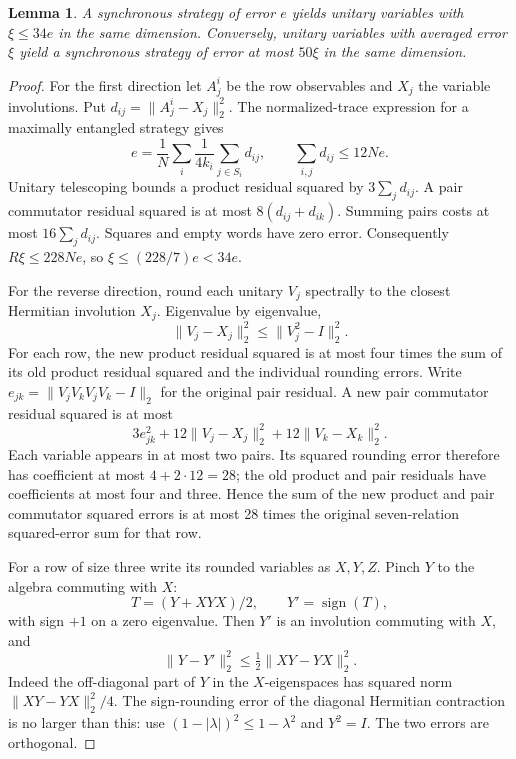 \documentclass[11pt,a4paper]{article}
\newtheorem{lemma}[theorem]{Lemma}
\newcommand{\norm}[1]{\lVert#1\rVert}
\begin{document}
\begin{lemma}\label{lem:gamewords}
A synchronous strategy of error $e$ yields unitary variables with $\xi\le34e$ in the same dimension. Conversely, unitary variables with averaged error $\xi$ yield a synchronous strategy of error at most $50\xi$ in the same dimension.
\end{lemma}
\begin{proof}
For the first direction let $A^i_j$ be the row observables and $X_j$ the variable involutions. Put $d_{ij}=\norm{A^i_j-X_j}_2^2$. The normalized-trace expression for a maximally entangled strategy gives
\[
 e=\frac1N\sum_i\frac1{4k_i}\sum_{j\in S_i}d_{ij},
 \qquad \sum_{i,j}d_{ij}\le12Ne.
\]
Unitary telescoping bounds a product residual squared by $3\sum_jd_{ij}$. A pair commutator residual squared is at most $8(d_{ij}+d_{ik})$. Summing pairs costs at most $16\sum_jd_{ij}$. Squares and empty words have zero error. Consequently $R\xi\le228Ne$, so $\xi\le(228/7)e<34e$.

For the reverse direction, round each unitary $V_j$ spectrally to the closest Hermitian involution $X_j$. Eigenvalue by eigenvalue,
\[
 \norm{V_j-X_j}_2^2\le\norm{V_j^2-I}_2^2.
\]
For each row, the new product residual squared is at most four times the sum of its old product residual squared and the individual rounding errors. Write $e_{jk}=\norm{V_jV_kV_jV_k-I}_2$ for the original pair residual. A new pair commutator residual squared is at most
\[
 3e_{jk}^2+12\norm{V_j-X_j}_2^2+12\norm{V_k-X_k}_2^2.
\]
Each variable appears in at most two pairs. Its squared rounding error therefore has coefficient at most $4+2\cdot12=28$; the old product and pair residuals have coefficients at most four and three. Hence the sum of the new product and pair commutator squared errors is at most 28 times the original seven-relation squared-error sum for that row.

For a row of size three write its rounded variables as $X,Y,Z$. Pinch $Y$ to the algebra commuting with $X$:
\[
 T=(Y+XYX)/2,\qquad Y'=\operatorname{sign}(T),
\]
with sign $+1$ on a zero eigenvalue. Then $Y'$ is an involution commuting with $X$, and
\begin{equation}
 \norm{Y-Y'}_2^2\le\tfrac12\norm{XY-YX}_2^2.             \label{eq:pinch}
\end{equation}
Indeed the off-diagonal part of $Y$ in the $X$-eigenspaces has squared norm $\norm{XY-YX}_2^2/4$. The sign-rounding error of the diagonal Hermitian contraction is no larger than this: use $(1-|\lambda|)^2\le1-\lambda^2$ and $Y^2=I$. The two errors are orthogonal.


\end{proof}
\end{document}
